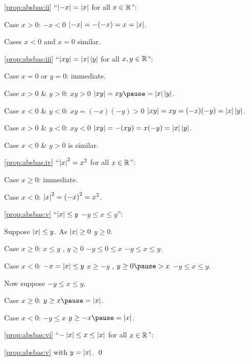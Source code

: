 \documentclass[10pt,aspectratio=169]{beamer}
\begin{document}
\begin{frame}

\eqref{prop:absbas:ii} ``$\left\lvert {-x} \right\rvert = \left\lvert {x} \right\rvert$ for all $x \in {\mathbb{R}}$'':

\pause
Case $x > 0$: \pause \quad $-x < 0$ \pause \wthus $\left\lvert {-x} \right\rvert = -(-x) = x = \left\lvert {x} \right\rvert$.

\pause
Cases $x < 0$ and $x=0$ similar.

\medskip
\pause

\eqref{prop:absbas:iii} ``$\left\lvert {xy} \right\rvert = \left\lvert {x} \right\rvert\left\lvert {y} \right\rvert$ for all $x,y \in {\mathbb{R}}$'':

\pause
Case $x=0$ or $y=0$: immediate.

\pause
Case $x > 0$ \& $y > 0$: \pause
\quad $xy > 0$ \pause \wthus
$\abs{xy} = xy \pause = \abs{x} \abs{y}$.

\pause
Case $x < 0$ \& $y < 0$: \pause
\quad $xy = (-x)(-y) > 0$ \pause
\wthus
$\left\lvert {xy} \right\rvert = xy = (-x)(-y) = \left\lvert {x} \right\rvert \left\lvert {y} \right\rvert$.

\pause
Case $x > 0$ \& $y < 0$: \pause
\quad
$xy < 0$
\pause
\wthus
$\left\lvert {xy} \right\rvert = -(xy) = x(-y) = \left\lvert {x} \right\rvert\left\lvert {y} \right\rvert$.

\pause
Case $x < 0$ \& $y > 0$ is similar.

\medskip
\pause

\eqref{prop:absbas:iv} ``$\left\lvert {x} \right\rvert^2 = x^2$ for all $x \in {\mathbb{R}}$'':

\pause
Case $x \geq 0$: immediate.

\pause
Case $x < 0$: \pause \quad $\left\lvert {x} \right\rvert^2 = {(-x)}^2 = x^2$.

\end{frame}

\begin{frame}

\eqref{prop:absbas:v} ``$\left\lvert {x} \right\rvert \leq y$ \wiffif $-y \leq x \leq y$'':

\medskip
\pause

Suppose $\left\lvert {x} \right\rvert \leq y$.  As $\lvert {x} \rvert \geq 0$ \wthus $y \geq 0$.

\pause
Case $x \geq 0$:
\pause \quad $x \leq y$ \pause \quad , \quad $y \geq 0$ \pause \wthus $-y
\leq 0 \leq x$ \pause \wthus $-y \leq x \leq y$.

\pause
Case $x < 0$: \pause \quad $-x = \left\lvert {x} \right\rvert \leq y$ \pause \wthus
$x \geq -y$ \pause \quad , \quad $y \geq 0 \pause > x$ \wthus
$-y \leq x \leq y$.

\medskip
\pause

Now suppose
$-y \leq x \leq y$.

\pause
Case $x \geq 0$: \pause \quad $y \geq x \pause = \abs{x}$.

\pause
Case $x < 0$: \pause \quad $-y \leq x$ \pause \wthus
$y \geq -x \pause = \abs{x}$.

\medskip
\pause

\eqref{prop:absbas:vi} ``$-\left\lvert {x} \right\rvert \leq x \leq \left\lvert {x} \right\rvert$ for all $x \in {\mathbb{R}}$'':

\pause
\eqref{prop:absbas:v} with $y = \left\lvert {x} \right\rvert$.
\qed
\end{frame}
\end{document}
